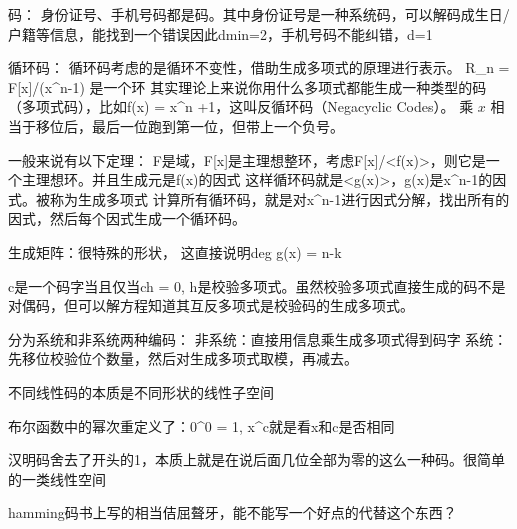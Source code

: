 码：
身份证号、手机号码都是码。其中身份证号是一种系统码，可以解码成生日/户籍等信息，能找到一个错误因此dmin=2，手机号码不能纠错，d=1

循环码：
循环码考虑的是循环不变性，借助生成多项式的原理进行表示。
R_n = F[x]/(x^n-1) 是一个环
其实理论上来说你用什么多项式都能生成一种类型的码（多项式码），比如f(x) = x^n +1，这叫反循环码（Negacyclic Codes）。
乘 $x$ 相当于移位后，最后一位跑到第一位，但带上一个负号。

一般来说有以下定理：
F是域，F[x]是主理想整环，考虑F[x]/<f(x)>，则它是一个主理想环。并且生成元是f(x)的因式
这样循环码就是<g(x)>，g(x)是x^n-1的因式。被称为生成多项式
计算所有循环码，就是对x^n-1进行因式分解，找出所有的因式，然后每个因式生成一个循环码。

生成矩阵：很特殊的形状，
这直接说明deg g(x) = n-k

c是一个码字当且仅当ch = 0, h是校验多项式。虽然校验多项式直接生成的码不是对偶码，但可以解方程知道其互反多项式是校验码的生成多项式。

分为系统和非系统两种编码：
非系统：直接用信息乘生成多项式得到码字
系统：先移位校验位个数量，然后对生成多项式取模，再减去。

不同线性码的本质是不同形状的线性子空间

布尔函数中的幂次重定义了：0^0 = 1, x^c就是看x和c是否相同

汉明码舍去了开头的1，本质上就是在说后面几位全部为零的这么一种码。很简单的一类线性空间

hamming码书上写的相当佶屈聱牙，能不能写一个好点的代替这个东西？
